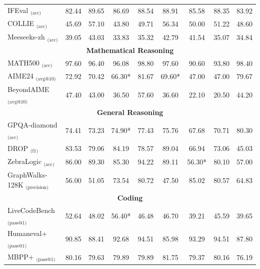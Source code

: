 \documentclass{article}
\begin{document}
\begin{table}[t]
{\begin{tabular}{l|c|c|ccc|ccc}
 \midrule 
         IFEval $_{\text{(acc)}}$ & 82.44 & 89.65 & 86.69 & 88.54 & 88.91 & 85.58 & 88.35 & 83.92 \\ 
         COLLIE $_{\text{(acc)}}$ & 45.69 & 57.10 & 43.80 & 49.71 & 56.34 & 50.00 & 51.22 & 48.60 \\ 
         Meeseeks-zh $_{\text{(acc)}}$ & 39.05 & 43.03 & 33.83 & 35.32 & 42.79 & 41.54 & 35.07 & 34.84 \\ 
         \midrule 
       
  \multicolumn{9}{c}{\textbf{Mathematical Reasoning}} \\ 
         \midrule 
         MATH500 $_{\text{(acc)}}$ & 97.60 & 96.40   & 96.08 & 98.80 & 97.60 & 90.60 & 93.80 & 98.40\\ 
         AIME24 $_{\text{(avg@10)}}$ & 72.92 &  70.42  & 66.30* & 81.67 & 69.60* & 47.00 & 47.00 & 79.67 \\ 
     BeyondAIME $_{\text{(avg@10)}}$ & 47.40 & 43.00 & 36.50 & 57.60 & 36.60 & 22.10 & 20.50 & 44.20 \\ 
         \midrule 
         \multicolumn{9}{c}{\textbf{General Reasoning}} \\ 
         \midrule 
         GPQA-diamond $_{\text{(acc)}}$ & 74.41 & 73.23 & 74.90* & 77.43 & 75.76 & 67.68 & 70.71 & 80.30 \\ 
         DROP $_{\text{(f1)}}$ & 83.53 & 79.06  & 84.19 & 78.57 & 89.04 & 66.94 & 73.06 & 45.03 \\ 
         ZebraLogic $_{\text{(acc)}}$ & 86.00 & 89.30  & 85.30 & 94.22 & 89.11 & 56.30* & 80.10 & 57.00 \\ 
         GraphWalks-128K $_{\text{(precision)}}$ & 56.00 & 51.05  & 73.54 & 80.72 & 47.50 & 85.02 & 80.57 & 64.83 \\ 
         \midrule 
         \multicolumn{9}{c}{\textbf{Coding}} \\ 
         \midrule 
   
         LiveCodeBench $_{\text{(pass@1)}}$ & 52.64 & 48.02 & 56.40*  & 46.48 & 46.70 & 39.21 & 45.59 & 39.65 \\ 
         Humaneval+ $_{\text{(pass@1)}}$ & 90.85 & 88.41  & 92.68 & 94.51 & 85.98 & 93.29 & 94.51 & 87.80 \\ 
         MBPP+ $_{\text{(pass@1)}}$ & 80.16 & 79.63  & 79.89 & 79.89 & 81.75 & 79.37 & 80.16 & 76.19 \\ 
         \bottomrule 
     \end{tabular}
     } 
 \end{table}
\end{document}
